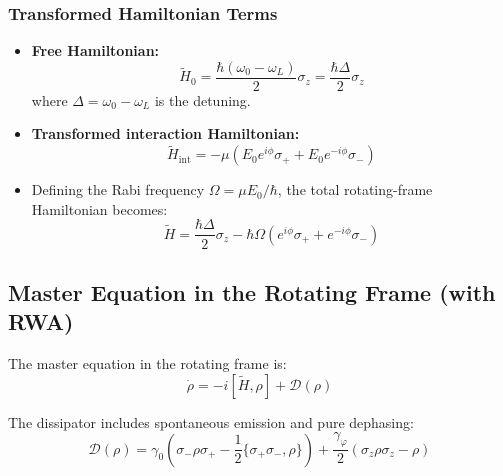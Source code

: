 \subsubsection{Transformed Hamiltonian Terms}

\begin{itemize}
	\item \textbf{Free Hamiltonian:}
	      \begin{equation}
		      \tilde{H}_0 = \frac{\hbar(\omega_0 - \omega_L)}{2} \sigma_z = \frac{\hbar\Delta}{2} \sigma_z
		      \label{eq:TransformedFreeHamiltonian}
	      \end{equation}
	      where \(\Delta = \omega_0 - \omega_L\) is the detuning.

	\item \textbf{Transformed interaction Hamiltonian:}
	      \begin{equation}
		      \tilde{H}_{\text{int}} = -\mu \left( E_0 e^{i\phi} \sigma_+ + E_0 e^{-i\phi} \sigma_- \right)
		      \label{eq:TransformedInteractionHamiltonian}
	      \end{equation}

	\item Defining the Rabi frequency \(\Omega = \mu E_0 / \hbar\), the total rotating-frame Hamiltonian becomes:
	      \begin{equation}
		      \boxed{
			      \tilde{H} = \frac{\hbar\Delta}{2} \sigma_z - \hbar \Omega \left( e^{i\phi} \sigma_+ + e^{-i\phi} \sigma_- \right)
		      }
		      \label{eq:RotatingFrameHamiltonian}
	      \end{equation}
\end{itemize}

\subsection{Master Equation in the Rotating Frame (with RWA)}

The master equation in the rotating frame is:
\begin{equation}
	\dot{\rho} = -i[\tilde{H}, \rho] + \mathcal{D}(\rho)
	\label{eq:MasterEquationRotatingFrame}
\end{equation}

The dissipator includes spontaneous emission and pure dephasing:
\begin{equation}
	\mathcal{D}(\rho) =
	\gamma_0 \left( \sigma_- \rho \sigma_+ - \frac{1}{2} \{ \sigma_+ \sigma_-, \rho \} \right)
	+ \frac{\gamma_\varphi}{2} \left( \sigma_z \rho \sigma_z - \rho \right)
	\label{eq:DissipatorOperator}
\end{equation}

